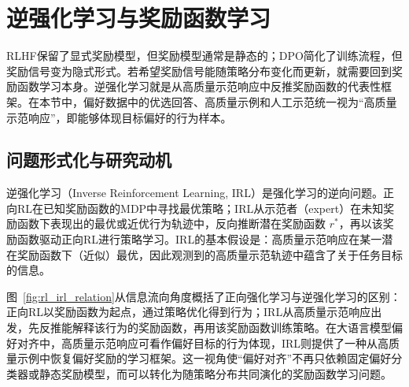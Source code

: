 \section{逆强化学习与奖励函数学习}

RLHF保留了显式奖励模型，但奖励模型通常是静态的；DPO简化了训练流程，但奖励信号变为隐式形式。若希望奖励信号能随策略分布变化而更新，就需要回到奖励函数学习本身。逆强化学习就是从高质量示范响应中反推奖励函数的代表性框架。在本节中，偏好数据中的优选回答、高质量示例和人工示范统一视为“高质量示范响应”，即能够体现目标偏好的行为样本。

\subsection{问题形式化与研究动机}

逆强化学习（Inverse Reinforcement Learning, IRL）\cite{ng2000algorithms}是强化学习的逆向问题。正向RL在已知奖励函数的MDP中寻找最优策略；IRL从示范者（expert）在未知奖励函数下表现出的最优或近优行为轨迹中，反向推断潜在奖励函数 $r^*$，再以该奖励函数驱动正向RL进行策略学习。IRL的基本假设是：高质量示范响应在某一潜在奖励函数下（近似）最优，因此观测到的高质量示范轨迹中蕴含了关于任务目标的信息。

图~\ref{fig:rl_irl_relation}从信息流向角度概括了正向强化学习与逆强化学习的区别：正向RL以奖励函数为起点，通过策略优化得到行为；IRL从高质量示范响应出发，先反推能解释该行为的奖励函数，再用该奖励函数训练策略。在大语言模型偏好对齐中，高质量示范响应可看作偏好目标的行为体现，IRL则提供了一种从高质量示例中恢复偏好奖励的学习框架。这一视角使“偏好对齐”不再只依赖固定偏好分类器或静态奖励模型，而可以转化为随策略分布共同演化的奖励函数学习问题。

